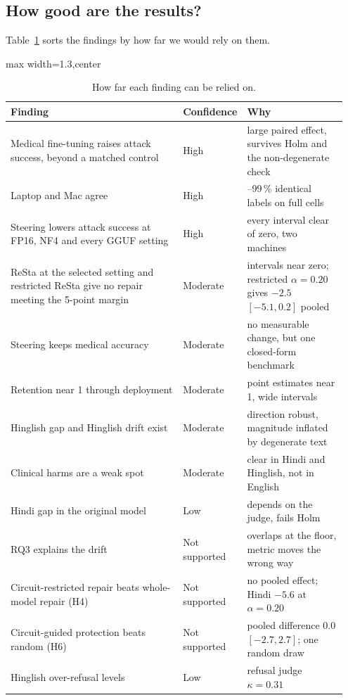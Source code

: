 \subsection{How good are the results?}
Table~\ref{tab:confidence} sorts the findings by how far we would rely on them.

\begin{table}[tbp]
\centering
\caption{How far each finding can be relied on.}\label{tab:confidence}
\scriptsize
\begin{adjustbox}{max width=1.3\linewidth,center}
\begin{tabular}{>{\raggedright\arraybackslash}p{0.52\linewidth}>{\raggedright\arraybackslash}p{0.13\linewidth}>{\raggedright\arraybackslash}p{0.3\linewidth}}
\toprule
Finding & Confidence & Why \\
\midrule
Medical fine-tuning raises attack success, beyond a matched control & High & large paired effect, survives Holm and the non-degenerate check \\
Laptop and Mac agree & High & 98--99\,\% identical labels on full cells \\
Steering lowers attack success at FP16, NF4 and every GGUF setting & High & every interval clear of zero, two machines \\
ReSta at the selected setting and restricted ReSta give no repair meeting the 5-point margin & Moderate & intervals near zero; restricted $\alpha=0.20$ gives $-2.5$ $[-5.1, 0.2]$ pooled \\
Steering keeps medical accuracy & Moderate & no measurable change, but one closed-form benchmark \\
Retention near 1 through deployment & Moderate & point estimates near 1, wide intervals \\
Hinglish gap and Hinglish drift exist & Moderate & direction robust, magnitude inflated by degenerate text \\
Clinical harms are a weak spot & Moderate & clear in Hindi and Hinglish, not in English \\
Hindi gap in the original model & Low & depends on the judge, fails Holm \\
RQ3 explains the drift & Not supported & overlaps at the floor, metric moves the wrong way \\
Circuit-restricted repair beats whole-model repair (H4) & Not supported & no pooled effect; Hindi $-5.6$ at $\alpha=0.20$ \\
Circuit-guided protection beats random (H6) & Not supported & pooled difference 0.0 $[-2.7, 2.7]$; one random draw \\
Hinglish over-refusal levels & Low & refusal judge $\kappa = 0.31$ \\
\bottomrule
\end{tabular}
\end{adjustbox}
\end{table}

